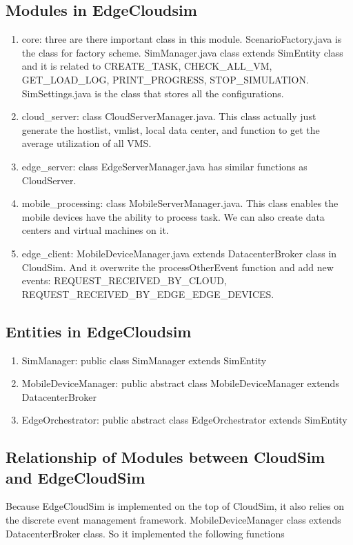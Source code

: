 \subsection{Modules in EdgeCloudsim}
\begin{enumerate}
	\item core: three are there important class in this module. ScenarioFactory.java is the class for factory scheme. SimManager.java class extends SimEntity class and it is related to CREATE\_TASK, CHECK\_ALL\_VM, GET\_LOAD\_LOG, PRINT\_PROGRESS, STOP\_SIMULATION. SimSettings.java is the class that stores all the configurations.
	\item cloud\_server: class CloudServerManager.java. This class actually just generate the hostlist, vmlist, local data center, and function to get the average utilization of all VMS. 
	\item edge\_server: class EdgeServerManager.java has similar functions as CloudServer.
	\item mobile\_processing: class MobileServerManager.java. This class enables the mobile devices have the ability to process task. We can also create data centers and virtual machines on it.
	\item edge\_client: MobileDeviceManager.java extends DatacenterBroker class in CloudSim. And it overwrite the processOtherEvent function and add new events: REQUEST\_RECEIVED\_BY\_CLOUD, REQUEST\_RECEIVED\_BY\_EDGE\_EDGE\_DEVICES.
\end{enumerate}


\subsection{Entities in EdgeCloudsim}
\begin{enumerate}
	\item SimManager: public class SimManager extends SimEntity
	\item MobileDeviceManager: public abstract class MobileDeviceManager  extends DatacenterBroker
	\item EdgeOrchestrator: public abstract class EdgeOrchestrator extends SimEntity
\end{enumerate}


\subsection{Relationship of Modules between CloudSim and EdgeCloudSim}
Because EdgeCloudSim is implemented on the top of CloudSim, it also relies on the discrete event management framework. 
MobileDeviceManager class extends DatacenterBroker class. So it implemented the following functions


